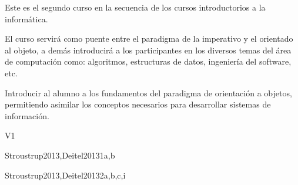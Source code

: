 \begin{syllabus}


\begin{justification}
Este es el segundo curso en la secuencia de los cursos introductorios a la informática.

El curso servirá como puente entre el paradigma de la imperativo y el orientado al objeto, a demás introducirá a los participantes en los diversos temas del área de computación como: algoritmos, estructuras de datos, ingeniería del software, etc.
\end{justification}

\begin{goals}
\item Introducir al alumno a los fundamentos del paradigma de
      orientación a objetos, permitiendo asimilar los conceptos
      necesarios para desarrollar  sistemas de información.
\end{goals}

\begin{outcomes}{V1}
\item {}
\item {}
\item {}
\item {}
\item {}
\item {}
\end{outcomes}

\begin{unit}{\SDFFundamentalProgrammingConcepts}{}{Stroustrup2013,Deitel2013}{1}{a,b}
   \SDFFundamentalProgrammingConceptsAllTopics

   \SDFFundamentalProgrammingConceptsAllLearningOutcomes
\end{unit}

\begin{unit}{\OSVirtualMachines}{}{Stroustrup2013,Deitel2013}{2}{a,b,c,i}
   \OSVirtualMachinesAllTopics
   
   \OSVirtualMachinesAllLearningOutcomes
\end{unit}

\begin{coursebibliography}
\end{coursebibliography}

\end{syllabus}
